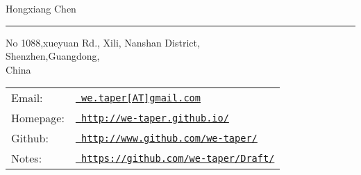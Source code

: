 \documentclass[letterpaper]{article}
\def\name{Hongxiang Chen}
\begin{document}
{\huge \name}
\vspace{+8pt}
\hrule height .7pt
\smallskip

\vspace{0.15in}

\begin{minipage}{0.44\linewidth}
  No 1088,xueyuan Rd., Xili, Nanshan District,\\
  Shenzhen,Guangdong,\\
  China \\
\end{minipage}
\begin{minipage}{0.55\linewidth}
  \begin{tabular}{ll}
  Email: & \href{mailto:we.taper[at]gmail.com}{\tt
we.taper[AT]gmail.com} \\
    Homepage: & \href{http://we-taper.github.io/}{\tt
http://we-taper.github.io/} \\
    Github: & \href{http://www.github.com/we-taper/}{\tt
http://www.github.com/we-taper/} \\
    Notes: & \href{https://github.com/we-taper/Draft/}{\tt
https://github.com/we-taper/Draft/} \\
  \end{tabular}
\end{minipage}
\end{document}
